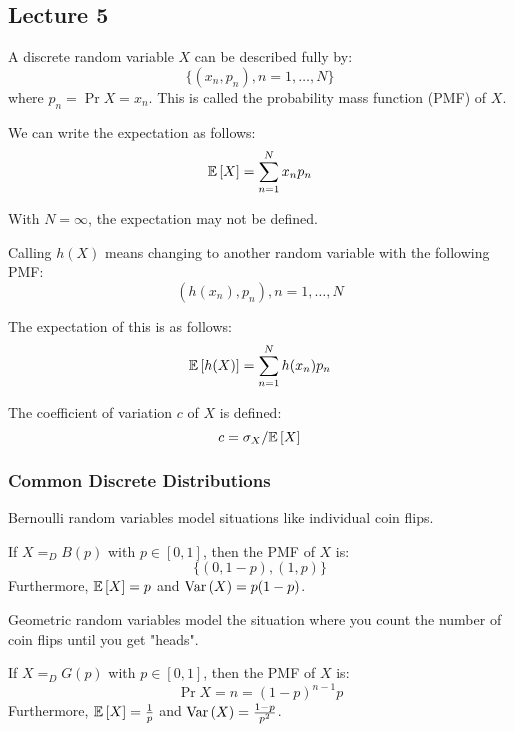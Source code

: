 \subsection{Lecture 5}

\begin{definition}
    A discrete random variable $X$ can be described fully by:
    \[ \{ (x_n, p_n), n = 1, \dots, N\} \] 
    where $p_n = \Pr{X = x_n}$. This is called the probability mass function (PMF)
    of $X$.
\end{definition}

We can write the expectation as follows:
\[ \mathbb{E}\left[ X \right] = \sum_{n = 1}^N x_n p_n \]

With $N = \infty$, the expectation may not be defined.

\begin{definition}
    Calling $h(X)$ means changing to another random variable with the following
    PMF:
    \[ (h(x_n), p_n), n = 1, \dots, N \]
\end{definition}

The expectation of this is as follows:
\[ \mathbb{E}\left[ h(X) \right] = \sum_{n = 1}^N h(x_n) p_n \]

\begin{definition}
    The coefficient of variation $c$ of $X$ is defined:
    \[ c = \sigma_X/\mathbb{E}\left[ X \right] \]
\end{definition}

\subsubsection{Common Discrete Distributions}

Bernoulli random variables model situations like individual coin flips.
\begin{definition}
    If $X =_D B(p)$ with $p \in [0, 1]$,
    then the PMF of $X$ is: \[\{(0, 1 - p), (1, p)\}\]
    Furthermore,
    $\mathbb{E}\left[ X \right] = p$ and $\text{Var}\left( X \right) = p(1-p)$.
\end{definition}

Geometric random variables model the situation where you count
the number of coin flips until you get "heads".
\begin{definition}
    If $X=_D G(p)$ with $p \in [0, 1]$,
    then the PMF of $X$ is:
    \[ \Pr{X = n} = (1 - p)^{n - 1} p \]
    Furthermore,
    $\mathbb{E}\left[ X \right] = \frac{1}{p}$ and $\text{Var}\left( X \right) = \frac{1 - p}{p^2}$.
\end{definition}

